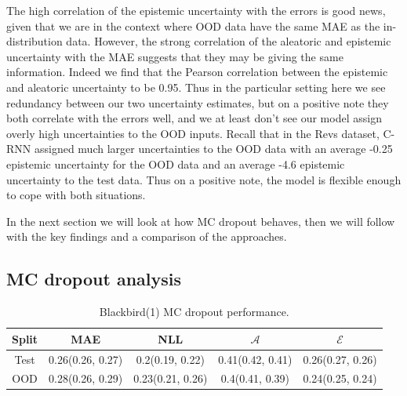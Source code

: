 The high correlation of the epistemic uncertainty with the errors is good news, given that we are in the context where OOD data have the same MAE as the in-distribution data. However, the strong correlation of the aleatoric and epistemic uncertainty with the MAE suggests that they may be giving the same information. Indeed we find that the Pearson correlation between the epistemic and aleatoric uncertainty to be 0.95. Thus in the particular setting here we see redundancy between our two uncertainty estimates, but on a positive note they both correlate with the errors well, and we at least don't see our model assign overly high uncertainties to the OOD inputs. Recall that in the Revs dataset, C-RNN assigned much larger uncertainties to the OOD data with an average -0.25 epistemic uncertainty for the OOD data and an average -4.6 epistemic uncertainty to the test data. Thus on a positive note, the model is flexible enough to cope with both situations. 

In the next section we will look at how MC dropout behaves, then we will follow with the key findings and a comparison of the approaches.


\clearpage
\subsection{MC dropout analysis}

\begin{table}[ht]
\centering
    \begin{tabular}{c  c  c   c  c }  
        \toprule
        Split & MAE & NLL & $\mathcal{A}$ & $\mathcal{E}$\\
        \midrule
        Test & 0.26(0.26, 0.27) & 0.2(0.19, 0.22) & 0.41(0.42, 0.41) &  0.26(0.27, 0.26)\\
        OOD  &  0.28(0.26, 0.29) &  0.23(0.21, 0.26) & 0.4(0.41, 0.39)&  0.24(0.25, 0.24)\\
        \midrule
    \end{tabular}
    \caption{Blackbird(1) MC dropout performance.}
    \label{tbl:bb1_dropout}
\end{table}

